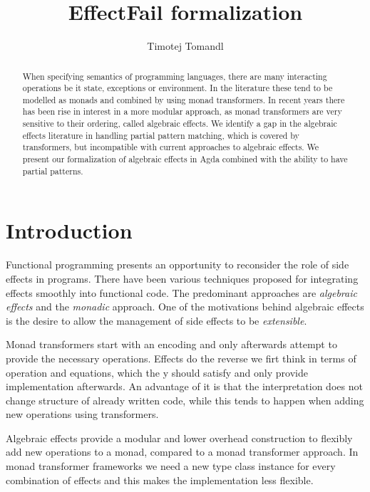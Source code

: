 \documentclass[10pt]{article}
\title{EffectFail formalization}
\author{Timotej Tomandl}
\theoremstyle{definition}
\theoremstyle{remark}
\begin{document}
\maketitle


\begin{abstract}
	When specifying semantics of programming languages, there are
        many interacting operations be it state, exceptions or
        environment. In the literature these tend to be modelled as monads and combined by using monad transformers.
	In recent years there has been rise in interest in a more
        modular approach, as monad transformers are very sensitive to their ordering, called algebraic effects.
	We identify a gap in the algebraic effects literature in handling partial
        pattern matching, which is covered by transformers, but
        incompatible with current approaches to algebraic effects.
	We present our formalization of algebraic effects in Agda combined with the ability to have partial patterns.
\end{abstract}

\section{Introduction}

Functional programming presents an opportunity to reconsider the role
of side effects in programs. There have been various techniques
proposed for integrating effects smoothly into functional code.
The predominant approaches are \emph{algebraic effects} and the
\emph{monadic} approach. One of the motivations behind algebraic
effects is the desire to allow the management of side effects
to be \emph{extensible}.

Monad transformers start with an encoding and only afterwards attempt to provide the necessary operations. Effects do the reverse we firt think in terms of operation and equations, which the
y should satisfy and only provide implementation afterwards. An advantage of it is that the interpretation does not change structure of already written code, while this tends to happen when adding new operations using transformers. \cite{exteffold}

Algebraic effects provide a modular and lower overhead construction to
flexibly add new operations to a monad, compared to a monad
transformer approach.
%
In monad transformer frameworks we need a new type class instance for every
combination of effects and this makes the implementation less
flexible.
\end{document}
